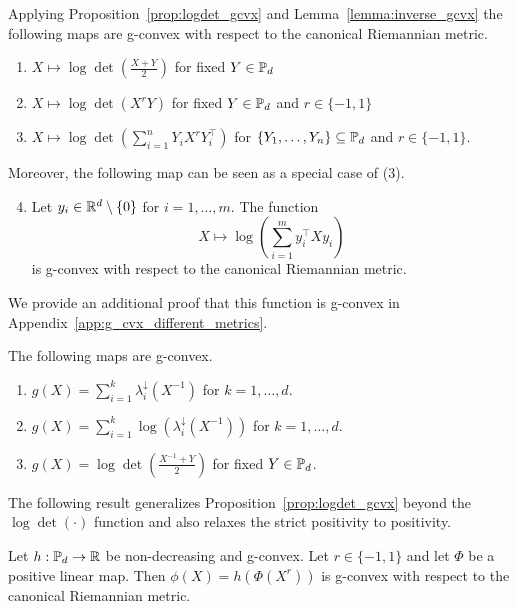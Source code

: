 \documentclass[twoside,11pt]{article}
\begin{document}
\begin{example}
    Applying Proposition~\ref{prop:logdet_gcvx} and Lemma~\ref{lemma:inverse_gcvx} the following maps are g-convex with respect to the canonical Riemannian metric.
    \begin{enumerate}
        \item $X \mapsto \log \det \left(\frac{X+Y}{2}\right)$ for fixed $Y \in \mathbb{P}_d$
        \item $X \mapsto \log \det \left(X^{r}Y \right)$ for fixed $Y \in \mathbb{P}_d$ and $r \in \{-1, 1\}$
        \item $X \mapsto \log \det \left(\sum_{i=1}^n Y_i X^{r} Y_i^\top \right)$ for $\{Y_1, \ldots, Y_n\} \subseteq \mathbb{P}_d$ and $r \in \{-1,1\}$.
    \end{enumerate}
    Moreover, the following map can be seen as a special case of (3). 
    \begin{enumerate}\setcounter{enumi}{3}
        \item Let $y_i \in \mathbb{R}^d \setminus \{0\}$ for $i = 1, \ldots, m$. The function 
        \[
        X \mapsto \log \left(\sum_{i=1}^m y_i^\top X y_i \right)
        \]
        is g-convex with respect to the canonical Riemannian metric.
    \end{enumerate}
    We provide an additional proof that this function is g-convex in Appendix~\ref{app:g_cvx_different_metrics}.
\end{example}
%
\begin{example}
The following maps are g-convex.
    \begin{enumerate}
        \item $g(X) = \sum_{i=1}^k \lambda_i^\downarrow(X^{-1})$ for $k = 1, \ldots, d.$
        \item $g(X) = \sum_{i=1}^k \log\left(\lambda_i^\downarrow(X^{-1})\right)$ for $k = 1, \ldots, d.$
        \item $g(X) = \log \det \left(\frac{X^{-1} + Y}{2}\right)$ for fixed $Y \in \mathbb{P}_d$.
    \end{enumerate}
\end{example}
%
The following result generalizes Proposition~\ref{prop:logdet_gcvx} beyond the $\log \det (\cdot)$ function and also relaxes the strict positivity to positivity.
%
\begin{prop}\label{prop:sra_thm15}
Let $h: \mathbb{P}_d \to \mathbb{R}$ be non-decreasing and g-convex. Let $r \in \{-1, 1\}$ and let $\Phi$ be a positive linear map. Then $\phi(X) = h\left(\Phi(X^r)\right)$ is g-convex with respect to the canonical Riemannian metric.
\end{prop}
\end{document}

